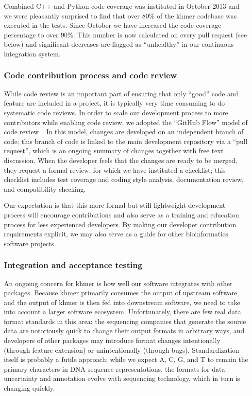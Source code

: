 \documentclass[12pt]{article}
\begin{document}
Combined C++ and Python code coverage was instituted in October 2013
and we were pleasantly surprised to find that over 80\% of the khmer
codebase was executed in the tests.  Since October we have increased
the code coverage percentage to over 90\%. This number is now
calculated on every pull request (see below) and significant decreases
are flagged as ``unhealthy'' in our continuous integration system.

\subsubsection{Code contribution process and code review}

While code review is an important part of ensuring that only ``good''
code and feature are included in a project, it is typically very time
consuming to do systematic code reviews.  In order to scale our
development process to more contributors while enabling code review,
we adopted the ``GitHub Flow'' model of code review~\cite{GitHubFlow}.
In this model, changes are developed on an independent branch
of code; this branch of code is linked to the main development
repository via a ``pull request'', which is an ongoing summary of
changes together with free text discussion.  When the developer feels
that the changes are ready to be merged, they request a formal review,
for which we have instituted a checklist; this checklist includes test
coverage and coding style analysis, documentation review, and
compatibility checking.

Our expectation is that this more formal but still lightweight
development process will encourage contributions and also serve as a
training and education process for less experienced developers.  By
making our developer contribution requirements explicit, we may also
serve as a guide for other bioinformatics software projects.

\subsubsection{Integration and acceptance testing}

An ongoing concern for khmer is how well our software integrates with
other packages.  Because khmer primarily consumes the output of
upstream software, and the output of khmer is then fed into downstream
software, we need to take into account a larger software ecosystem.
Unfortunately, there are few real data format standards in this area:
the sequencing companies that generate the source data are notoriously
quick to change their output formats in arbitrary ways, and developers
of other packages may introduce format changes intentionally (through
feature extension) or unintentionally (through bugs).  Standardization
itself is probably a futile approach: while we expect A, C, G, and
T to remain the primary characters in DNA sequence representations,
the formats for data uncertainty and annotation evolve with
sequencing technology, which in turn is changing quickly.
\end{document}
